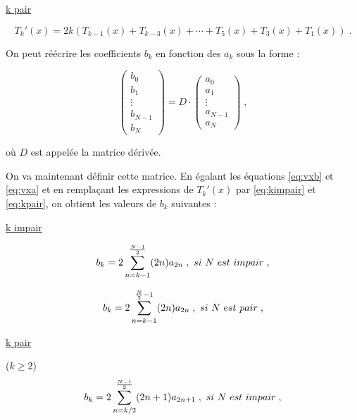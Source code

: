 \documentclass{report}
\begin{document}
\underline{k pair} 

\begin{equation}
T_{k}'(x)  = 2k\left(T_{k-1}(x)+T_{k-3}(x)+\cdots+T_{5}(x)+T_{3}(x)+T_{1}(x)\right)\;.\label{eq:kpair}
\end{equation}

On peut réécrire les coefficients $b_{k}$ en fonction des $a_{k}$ sous la forme :

\begin{equation}
\begin{pmatrix}
 b_{0}\\ 
 b_{1}\\ 
 \vdots\\ 
 b_{N-1}\\ 
 b_{N}
\end{pmatrix} 
= D \cdot \begin{pmatrix}
 a_0\\ 
 a_1\\ 
 \vdots\\ 
 a_{N-1}\\ 
 a_{N}
\end{pmatrix}\;,
\end{equation}

où $D$ est appelée la matrice dérivée.

On va maintenant définir cette matrice. En égalant les équations \eqref{eq:vxb} et \eqref{eq:vxa} et en remplaçant les expressions de $T_{k}'(x)$ par \eqref{eq:kimpair} et \eqref{eq:kpair}, on obtient les valeurs de $b_{k}$ suivantes :

\underline{k impair} 

\begin{equation}
b_{k} = 2\sum_{n=k-1}^{\frac{N-1}{2}}(2n)a_{2n} \;, \\\\\ si \ N \ est \ impair\;,
\end{equation}

\begin{equation}
b_{k} = 2\sum_{n=k-1}^{\frac{N}{2}-1}(2n) a_{2n} \;, \\\\\ si \ N \ est \ pair\;,
\end{equation}


\underline{k pair} 

 ($k\geq2$)
\begin{equation}\label{eq:bpairNimpair}
b_{k} = 2\sum_{n=k/2}^{\frac{N-1}{2}}(2n+1)a_{2n+1} \;, \\\\\ si \ N \ est \ impair\;,
\end{equation}
\end{document}
